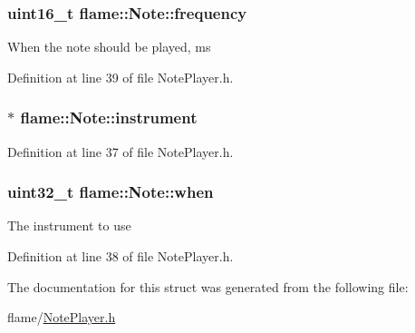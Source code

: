 \hypertarget{structflame_1_1_note_abd7e36428d825d141a957c492b686a2d}{
\subsubsection[{frequency}]{\setlength{\rightskip}{0pt plus 5cm}uint16\-\_\-t flame\-::\-Note\-::frequency}}\label{structflame_1_1_note_abd7e36428d825d141a957c492b686a2d}
When the note should be played, ms 

Definition at line 39 of file Note\-Player.\-h.

\hypertarget{structflame_1_1_note_a6fbc1cc3f50e9897899a31cb7f64e074}{
\subsubsection[{instrument}]{$\ast$ flame\-::\-Note\-::instrument}}\label{structflame_1_1_note_a6fbc1cc3f50e9897899a31cb7f64e074}


Definition at line 37 of file Note\-Player.\-h.

\hypertarget{structflame_1_1_note_ae6c2eda98121a00dec8a917d2cbd7ac0}{
\subsubsection[{when}]{\setlength{\rightskip}{0pt plus 5cm}uint32\-\_\-t flame\-::\-Note\-::when}}\label{structflame_1_1_note_ae6c2eda98121a00dec8a917d2cbd7ac0}
The instrument to use 

Definition at line 38 of file Note\-Player.\-h.



The documentation for this struct was generated from the following file\-:\begin{DoxyCompactItemize}
\item 
flame/\hyperlink{_note_player_8h}{Note\-Player.\-h}\end{DoxyCompactItemize}
